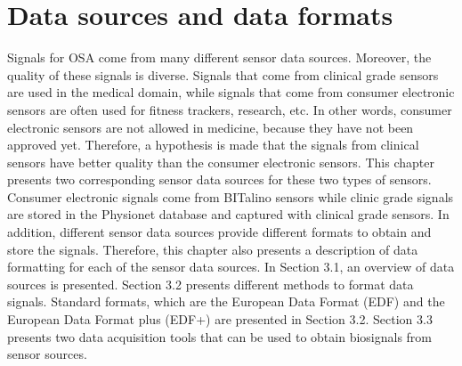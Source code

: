 \chapter{Data sources and data formats}
Signals for OSA come from many different sensor data sources. Moreover, the quality of these signals is diverse. Signals that come from clinical grade sensors are used in the medical domain, while signals that come from consumer electronic sensors are often used for fitness trackers, research, etc. In other words, consumer electronic sensors are not allowed in medicine, because they have not been approved yet. Therefore, a hypothesis is made that the signals from clinical sensors have better quality than the consumer electronic sensors. This chapter presents two corresponding sensor data sources for these two types of sensors. Consumer electronic signals come from BITalino sensors while clinic grade signals are stored in the Physionet database and captured with clinical grade sensors. In addition, different sensor data sources provide different formats to obtain and store the signals. Therefore, this chapter also presents a description of data formatting for each of the sensor data sources. In Section 3.1, an overview of data sources is presented. Section 3.2 presents different methods to format data signals. Standard formats, which are the European Data Format (EDF)\cite{EDF1} and the European Data Format plus (EDF+) are presented in Section 3.2. Section 3.3 presents two data acquisition tools that can be used to obtain biosignals from sensor sources.
